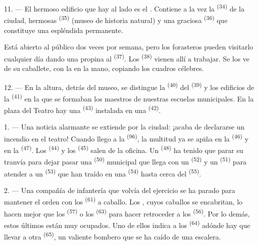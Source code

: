 \VUsaut{4.0mm}
\VUsaut{3.4mm}

11. --- El hermoso edificio que hay al lado es el . Contiene a
la vez la  \textsuperscript{(34)} de la ciudad, hermosas
 \textsuperscript{(35)} (museo de historia
natural) y una graciosa  \textsuperscript{(36)} que
constituye una espléndida  permanente.

Está abierto al público dos veces por semana, pero los forasteros pueden
visitarlo cualquier día dando una propina al 
\textsuperscript{(37)}. Los  \textsuperscript{(38)} vienen allí a trabajar. Se
los ve  de su caballete, con la  en la mano,
copiando los cuadros célebres.

12. --- En la altura, detrás del museo, se distingue la 
\textsuperscript{(40)} del  \textsuperscript{(39)} y los edificios de la
 \textsuperscript{(41)} en la que se formaban los maestros de
nuestras escuelas municipales. En la plaza del Teatro hay una
 \textsuperscript{(43)} instalada en una  \textsuperscript{(42)}.

\VUsaut{5.0mm}
\VUsaut{3.0mm}

\VUsaut{3.4mm}

1. --- Una noticia alarmante se extiende por la ciudad: ¡acaba de
declararse un incendio en el teatro! Cuando llego a la 
\textsuperscript{(96)}, la multitud ya se apiña en la  \textsuperscript{(46)} y
en la  \textsuperscript{(47)}. Los 
\textsuperscript{(44)} y los  \textsuperscript{(45)} salen de la oficina. Un
 \textsuperscript{(48)} ha tenido que parar su tranvía
para dejar pasar una  \textsuperscript{(50)} municipal que llega
con un  \textsuperscript{(52)} y un  \textsuperscript{(51)}
para atender a un  \textsuperscript{(53)} que han traído en una
 \textsuperscript{(54)} hasta cerca del 
\textsuperscript{(55)}.

2. --- Una compañía de infantería que volvía del ejercicio se ha parado
para mantener el orden con los  \textsuperscript{(61)} a
caballo. Los , cuyos caballos se encabritan, lo hacen mejor
que los  \textsuperscript{(57)} o los 
\textsuperscript{(63)} para hacer retroceder a los 
\textsuperscript{(56)}. Por lo demás, estos
últimos están muy ocupados. Uno de ellos indica a los  \textsuperscript{(64)} adónde hay que llevar a otra 
\textsuperscript{(65)}, un valiente bombero que se ha caído de una escalera.

